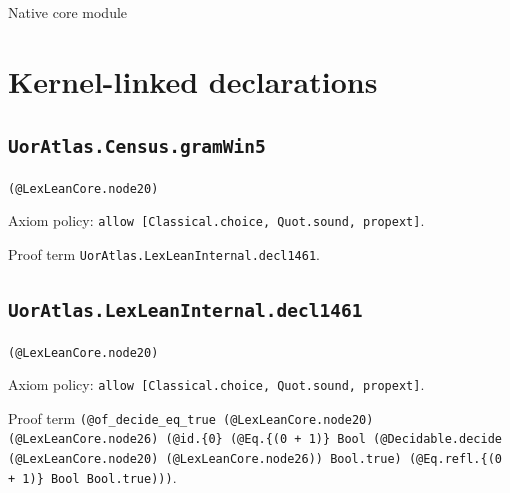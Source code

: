 \documentclass[11pt]{article}
\begin{document}
\begin{center}{\LARGE Native core module}\end{center}
\section*{Kernel-linked declarations}
\subsection*{\texttt{UorAtlas.Census.gramWin5}}
\noindent\texttt{(@LexLeanCore.node20)}\par
\noindent Axiom policy: \texttt{allow [Classical.choice, Quot.sound, propext]}.\par
\noindent Proof term \texttt{UorAtlas.LexLeanInternal.decl1461}.\par
\subsection*{\texttt{UorAtlas.LexLeanInternal.decl1461}}
\noindent\texttt{(@LexLeanCore.node20)}\par
\noindent Axiom policy: \texttt{allow [Classical.choice, Quot.sound, propext]}.\par
\noindent Proof term \texttt{(@of\_decide\_eq\_true (@LexLeanCore.node20) (@LexLeanCore.node26) (@id.\{0\} (@Eq.\{(0 + 1)\} Bool (@Decidable.decide (@LexLeanCore.node20) (@LexLeanCore.node26)) Bool.true) (@Eq.refl.\{(0 + 1)\} Bool Bool.true)))}.\par
\end{document}
